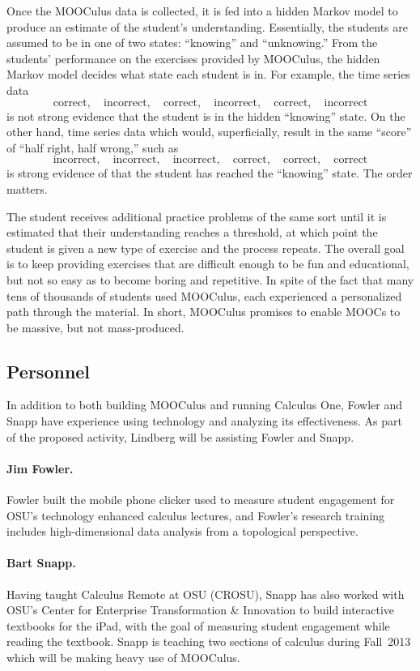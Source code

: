 \documentclass[12pt]{article}
\begin{document}
Once the MOOCulus data is collected, it is fed into a hidden Markov
model to produce an estimate of the student's
understanding. Essentially, the students are assumed to be in one of
two states: ``knowing'' and ``unknowing.''  From the students'
performance on the exercises provided by MOOCulus, the hidden Markov
model decides what state each student is in.  For example, the time series data
$$
\mbox{correct},\quad\mbox{incorrect},\quad\mbox{correct},\quad\mbox{incorrect},\quad\mbox{correct},\quad\mbox{incorrect}
$$
is not strong evidence that the student is in the hidden ``knowing''
state.  On the other hand, time series data which would,
superficially, result in the same ``score'' of ``half right, half wrong,'' such as
$$
\mbox{incorrect},\quad\mbox{incorrect},\quad\mbox{incorrect},\quad\mbox{correct},\quad\mbox{correct},\quad\mbox{correct}
$$
is strong evidence of that the student has reached the ``knowing''
state.  The order matters.

The student receives additional practice problems of the same sort
until it is estimated that their understanding reaches a threshold, at
which point the student is given a new type of exercise and the
process repeats.  The overall goal is to keep providing exercises that
are difficult enough to be fun and educational, but not so easy as to
become boring and repetitive.  In spite of the fact that many tens of
thousands of students used MOOCulus, each experienced a personalized
path through the material.  In short, MOOCulus promises to enable
MOOCs to be massive, but not mass-produced.

\subsection*{Personnel}

In addition to both building MOOCulus and running Calculus One, Fowler
and Snapp have experience using technology and analyzing its
effectiveness.  As part of the proposed activity, Lindberg will be
assisting Fowler and Snapp.

\paragraph*{Jim Fowler.} Fowler built the mobile phone
clicker used to measure student engagement for OSU's technology
enhanced calculus lectures, and Fowler's research training includes
high-dimensional data analysis from a topological perspective.

\paragraph*{Bart Snapp.} Having taught Calculus Remote at OSU (CROSU),
Snapp has also worked with OSU's Center for Enterprise Transformation
\& Innovation to build interactive textbooks for the iPad, with the
goal of measuring student engagement while reading the textbook.
Snapp is teaching two sections of calculus during Fall~2013 which will
be making heavy use of MOOCulus.
\end{document}
